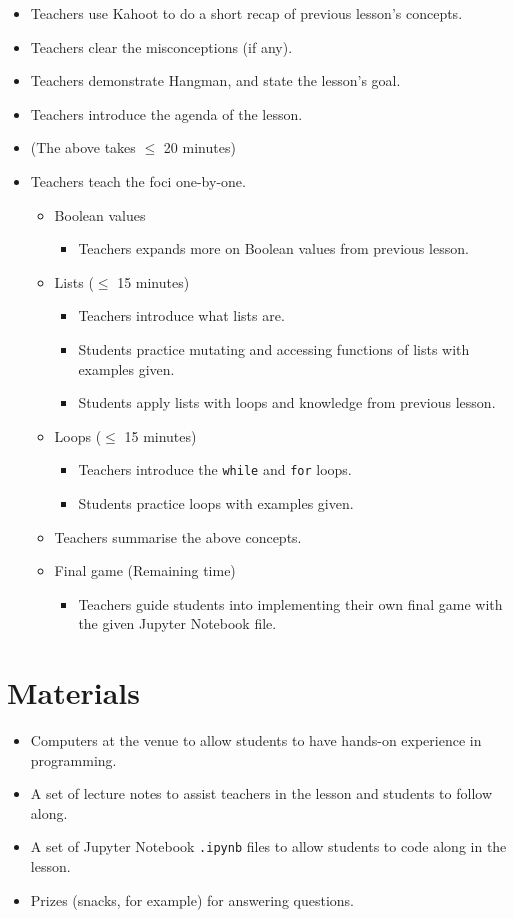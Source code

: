 \documentclass{article}
\def\T{Teachers }
\def\t{teachers }
\def\S{Students }
\def\s{students }
\begin{document}
\begin{itemize}
\item \T use Kahoot to do a short recap of previous lesson's concepts.
\item \T clear the misconceptions (if any).
\item \T demonstrate Hangman, and state the lesson's goal.
\item \T introduce the agenda of the lesson.
\item[] (The above takes $\leq$ 20 minutes)
\item \T teach the foci one-by-one.
	\begin{itemize}
	\item Boolean values
		\begin{itemize}
		\item \T expands more on Boolean values from previous lesson.
		\end{itemize}
	\item Lists ($\leq$ 15 minutes)
		\begin{itemize}
		\item \T introduce what lists are.
		\item \S practice mutating and accessing functions of lists with examples given.
		\item \S apply lists with loops and knowledge from previous lesson.
		\end{itemize}
	\item Loops ($\leq$ 15 minutes)
		\begin{itemize}
		\item \T introduce the \texttt{while} and \texttt{for} loops.
		\item \S practice loops with examples given.
		\end{itemize}
	\item \T summarise the above concepts.
	\item Final game (Remaining time)
		\begin{itemize}
		\item \T guide \s into implementing their own final game with the given Jupyter Notebook file. 
		\end{itemize}
	\end{itemize}
\end{itemize}

\section*{Materials}

\begin{itemize}
\item Computers at the venue to allow \s to have hands-on experience in programming.
\item A set of lecture notes to assist \t in the lesson and \s to follow along.
\item A set of Jupyter Notebook \texttt{.ipynb} files to allow \s to code along in the lesson.
\item Prizes (snacks, for example) for answering questions.
\end{itemize}
\end{document}
